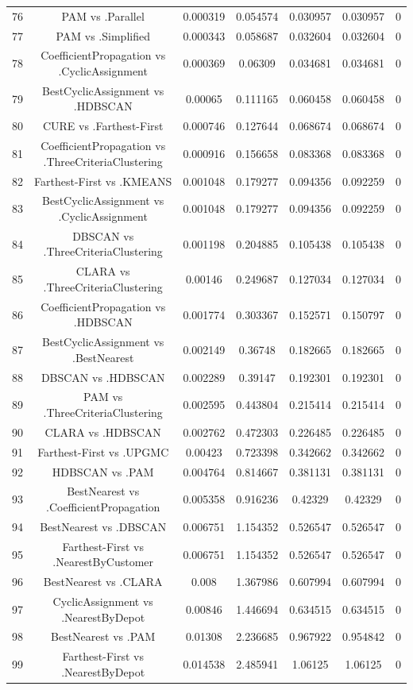 \documentclass[a4paper,10pt]{article}
\begin{document}
\begin{landscape}
\begin{table}[!htp]
\begin{tabular}{ccccccc}
76&PAM vs .Parallel&0.000319&0.054574&0.030957&0.030957&0\\
77&PAM vs .Simplified&0.000343&0.058687&0.032604&0.032604&0\\
78&CoefficientPropagation vs .CyclicAssignment&0.000369&0.06309&0.034681&0.034681&0\\
79&BestCyclicAssignment vs .HDBSCAN&0.00065&0.111165&0.060458&0.060458&0\\
80&CURE vs .Farthest-First&0.000746&0.127644&0.068674&0.068674&0\\
81&CoefficientPropagation vs .ThreeCriteriaClustering&0.000916&0.156658&0.083368&0.083368&0\\
82&Farthest-First vs .KMEANS&0.001048&0.179277&0.094356&0.092259&0\\
83&BestCyclicAssignment vs .CyclicAssignment&0.001048&0.179277&0.094356&0.092259&0\\
84&DBSCAN vs .ThreeCriteriaClustering&0.001198&0.204885&0.105438&0.105438&0\\
85&CLARA vs .ThreeCriteriaClustering&0.00146&0.249687&0.127034&0.127034&0\\
86&CoefficientPropagation vs .HDBSCAN&0.001774&0.303367&0.152571&0.150797&0\\
87&BestCyclicAssignment vs .BestNearest&0.002149&0.36748&0.182665&0.182665&0\\
88&DBSCAN vs .HDBSCAN&0.002289&0.39147&0.192301&0.192301&0\\
89&PAM vs .ThreeCriteriaClustering&0.002595&0.443804&0.215414&0.215414&0\\
90&CLARA vs .HDBSCAN&0.002762&0.472303&0.226485&0.226485&0\\
91&Farthest-First vs .UPGMC&0.00423&0.723398&0.342662&0.342662&0\\
92&HDBSCAN vs .PAM&0.004764&0.814667&0.381131&0.381131&0\\
93&BestNearest vs .CoefficientPropagation&0.005358&0.916236&0.42329&0.42329&0\\
94&BestNearest vs .DBSCAN&0.006751&1.154352&0.526547&0.526547&0\\
95&Farthest-First vs .NearestByCustomer&0.006751&1.154352&0.526547&0.526547&0\\
96&BestNearest vs .CLARA&0.008&1.367986&0.607994&0.607994&0\\
97&CyclicAssignment vs .NearestByDepot&0.00846&1.446694&0.634515&0.634515&0\\
98&BestNearest vs .PAM&0.01308&2.236685&0.967922&0.954842&0\\
99&Farthest-First vs .NearestByDepot&0.014538&2.485941&1.06125&1.06125&0\\

\end{tabular}
\end{table}
\end{landscape}
\end{document}
